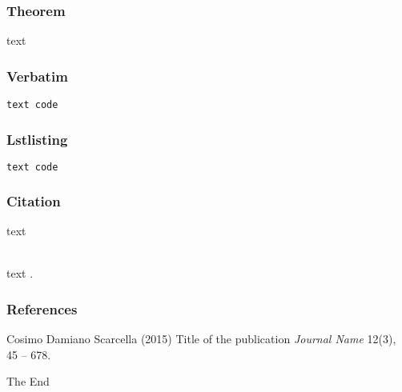 \documentclass[xcolor=table]{beamer}
\begin{document}


\begin{frame}
\frametitle{Theorem}
\begin{theorem}
text
\end{theorem}
\end{frame}


\begin{frame}[fragile] %
\frametitle{Verbatim}
\begin{example}[Code]
\begin{verbatim}
text code
\end{verbatim}
\end{example}
\end{frame}


\begin{frame}[fragile]
\frametitle{Lstlisting}
\begin{example}[Code]
\begin{lstlisting}[language=bash, frame=single]
text code
\end{lstlisting}
\end{example}
\end{frame}


\begin{frame}[fragile] %
\frametitle{Citation}
text\\~

text \cite{p1}.
\end{frame}


\begin{frame}
\frametitle{References}
\footnotesize{
\begin{thebibliography}{99} %
 Cosimo Damiano Scarcella (2015)
\newblock Title of the publication
\newblock \emph{Journal Name} 12(3), 45 -- 678.
\end{thebibliography}
}
\end{frame}


\begin{frame}
\Huge{\centerline{The End}}
\end{frame}

\end{document}
